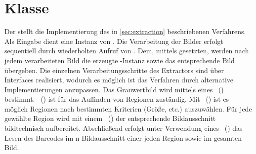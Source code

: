 \section{Klasse }
Der  stellt die Implementierung des in \autoref{sec:extraction} beschriebenen Verfahrens.
Als Eingabe dient eine Instanz von .
Die Verarbeitung der Bilder erfolgt sequentiell durch wiederholten Aufruf von .
Dem, mittels  gesetzten,  werden nach jedem verarbeiteten Bild die erzeugte -Instanz sowie das entsprechende Bild übergeben.
\noindent
Die einzelnen Verarbeitungsschritte des Extractors sind über Interfaces realisiert, wodurch es möglich ist das Verfahren durch alternative Implementierungen anzupassen.
Das Grauwertbild wird mittels eines ~() bestimmt.
~() ist für das Auffinden von Regionen zuständig.
Mit ~() ist es möglich Regionen nach bestimmten Kriterien (Größe, etc.) auszuwählen.
Für jede gewählte Region wird mit einem ~() der entsprechende Bildausschnitt bildtechnisch aufbereitet.
Abschließend erfolgt unter Verwendung eines ~() das Lesen des Barcodes im n Bildausschnitt einer jeden Region sowie im gesamten Bild.






